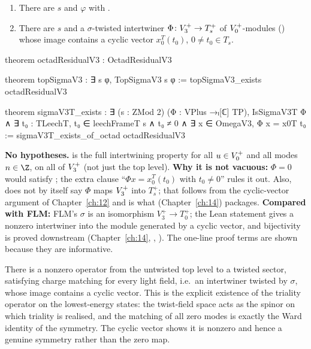 \begin{theorem}[$\sigma$ on $V_3^+$]\label{ch13:thm:topSigmaV3}
\begin{enumerate}[label=(\alph*)]
\item There are $s$ and $\varphi$ with .
\item There are $s$ and a $\sigma$-twisted intertwiner $\Phi\colon V_3^{+}\to T_{s}^{+}$ of $V_0^{+}$-modules
  () whose image contains a cyclic vector $x_0^T(t_0)$, $0\ne t_0\in T_s$.
\end{enumerate}
\end{theorem}
\begin{leancode}
theorem octadResidualV3 : OctadResidualV3

theorem topSigmaV3 : ∃ s φ, TopSigmaV3 s φ := topSigmaV3_exists octadResidualV3

theorem sigmaV3T_exists :
    ∃ (s : ZMod 2) (Φ : VPlus →ₗ[ℂ] TP), IsSigmaV3T Φ ∧
      ∃ t₀ : TLeechT, t₀ ∈ leechFrameT s ∧ t₀ ≠ 0 ∧ ∃ x ∈ OmegaV3, Φ x = x0T t₀ :=
  sigmaV3T_exists_of_octad octadResidualV3
\end{leancode}
\begin{dictionary}
\textbf{No hypotheses.}  is the full intertwining property for all $u\in V_0^{+}$ and all modes
$n\in\Z$, on all of $V_3^{+}$ (not just the top level). \textbf{Why it is not vacuous:} $\Phi=0$ would satisfy
; the extra clause ``$\Phi x=x_0^T(t_0)$ with $t_0\ne0$'' rules it out. Also, 
does not by itself say $\Phi$ maps $V_3^{+}$ into $T_s^+$; that follows from the cyclic-vector argument of
Chapter~\ref{ch:12} and is what  (Chapter~\ref{ch:14}) packages. \textbf{Compared with FLM:}
FLM's $\sigma$ is an isomorphism $V_3^+\to T_0^+$; the Lean statement gives a nonzero intertwiner into the
module generated by a cyclic vector, and bijectivity is proved downstream (Chapter~\ref{ch:14},
, ). The one-line proof terms are shown because they are informative.
\end{dictionary}
\begin{physics}
There is a nonzero operator from the untwisted top level to a twisted sector, satisfying charge matching for every light field, i.e.\ an intertwiner twisted by $\sigma$, whose image contains a cyclic vector. This is the explicit existence of the triality operator on the lowest-energy states: the twist-field space acts as the spinor on which triality is realised, and the matching of all zero modes is exactly the Ward identity of the symmetry. The cyclic vector shows it is nonzero and hence a genuine symmetry rather than the zero map.
\end{physics}

